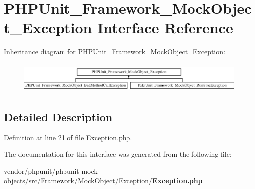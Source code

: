 \section{P\+H\+P\+Unit\+\_\+\+Framework\+\_\+\+Mock\+Object\+\_\+\+Exception Interface Reference}
\label{interface_p_h_p_unit___framework___mock_object___exception}
Inheritance diagram for P\+H\+P\+Unit\+\_\+\+Framework\+\_\+\+Mock\+Object\+\_\+\+Exception\+:\begin{figure}[H]
\begin{center}
\leavevmode
\includegraphics[height=1.559888cm]{interface_p_h_p_unit___framework___mock_object___exception}
\end{center}
\end{figure}


\subsection{Detailed Description}


Definition at line 21 of file Exception.\+php.



The documentation for this interface was generated from the following file\+:\begin{DoxyCompactItemize}
\item 
vendor/phpunit/phpunit-\/mock-\/objects/src/\+Framework/\+Mock\+Object/\+Exception/{\bf Exception.\+php}\end{DoxyCompactItemize}
